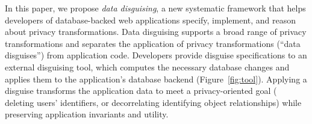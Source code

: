 %
%
%
%
%

%
%



%
In this paper, we propose \emph{data disguising}, a new systematic framework that helps developers
of database-backed web applications specify, implement, and reason about privacy transformations.
%
Data disguising supports a broad range of privacy transformations and separates the application
of privacy transformations (``data disguises'') from application code.
%
Developers provide disguise specifications to an external disguising tool, which computes the necessary
database changes and applies them to the application's database backend (Figure~\ref{fig:tool}).
%
Applying a disguise transforms the application data to meet a privacy-oriented goal (\eg
deleting users' identifiers, or decorrelating identifying object relationships) while preserving
application invariants and utility.
%


